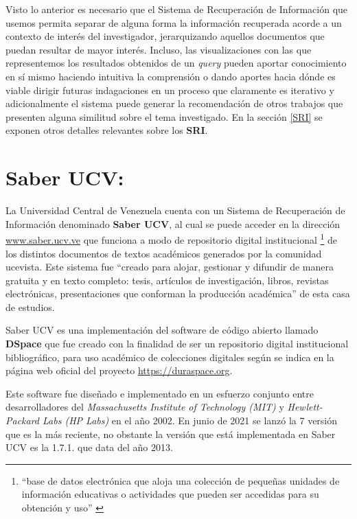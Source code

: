 \documentclass[
  10,
  openany]{book}
\begin{document}
Visto lo anterior es necesario que el Sistema de Recuperación de Información que usemos permita separar de alguna forma la información recuperada acorde a un contexto de interés del investigador, jerarquizando aquellos documentos que puedan resultar de mayor interés. Incluso, las visualizaciones con las que representemos los resultados obtenidos de un \emph{query} pueden aportar conocimiento en sí mismo haciendo intuitiva la comprensión \citep{zhang2008} o dando aportes hacia dónde es viable dirigir futuras indagaciones en un proceso que claramente es iterativo \citep{zhai2016} y adicionalmente el sistema puede generar la recomendación de otros trabajos \citep{aggarwal2018} que presenten alguna similitud sobre el tema investigado. En la sección \ref{SRI} se exponen otros detalles relevantes sobre los \textbf{SRI}.

\hypertarget{saber}{%
\section{Saber UCV:}\label{saber}}

La Universidad Central de Venezuela cuenta con un Sistema de Recuperación de Información denominado \textbf{Saber UCV}, al cual se puede acceder en la dirección \href{http://saber.ucv.ve/}{www.saber.ucv.ve} que funciona a modo de repositorio digital institucional \footnote{``base de datos electrónica que aloja una colección de pequeñas unidades de información educativas o actividades que pueden ser accedidas para su obtención y uso'' \citep{lehman2007}} de los distintos documentos de textos académicos generados por la comunidad ucevista. Este sistema fue ``creado para alojar, gestionar y difundir de manera gratuita y en texto completo: tesis, artículos de investigación, libros, revistas electrónicas, presentaciones que conforman la producción académica'' de esta casa de estudios.

Saber UCV es una implementación del software de código abierto llamado \textbf{DSpace} que fue creado con la finalidad de ser un repositorio digital institucional bibliográfico, para uso académico de colecciones digitales según se indica en la página web oficial del proyecto \href{https://duraspace.org/dspace/about/}{https://duraspace.org}.

Este software fue diseñado e implementado en un esfuerzo conjunto entre desarrolladores del \emph{Massachusetts Institute of Technology (MIT)} y \emph{Hewlett-Packard Labs (HP Labs)} en el año 2002. En junio de 2021 se lanzó la 7 versión que es la más reciente, no obstante la versión que está implementada en Saber UCV es la 1.7.1. que data del año 2013.
\end{document}
